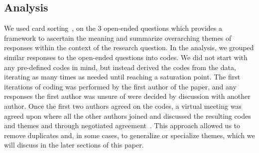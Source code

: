 \subsection{Analysis}
\label{sec:card_sorting}
We used card sorting~\cite{zimmermann2016card}, on the 3 open-ended questions which provides a framework to ascertain the meaning and summarize overarching themes of responses within the context of the research question. In the analysis, we grouped similar responses to the open-ended questions into codes. We did not start with any pre-defined codes in mind, but instead derived the codes from the data, iterating as many times as needed until reaching a saturation point. The first iterations of coding was performed by the first author of the paper, and any responses the first author was unsure of were decided by discussion with another author. Once the first two authors agreed on the codes, a virtual meeting was agreed upon where all the other authors joined and discussed the resulting codes and themes and through negotiated agreement~\cite{Garrison:2006}. This approach allowed us to remove duplicates and, in some cases, to generalize or specialize themes, which we will discuss in the later sections of this paper.



